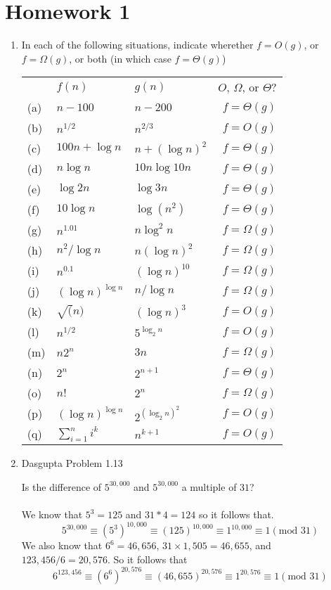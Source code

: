 \documentclass[a4paper,12pt]{article}
\begin{document}
\section*{Homework 1}

\begin{enumerate}
    \item In each of the following situations, indicate wherether $f = O(g)$, or $f = \Omega(g)$, or both (in which case $f = \Theta(g)$)

    \begin{tabular}{lll|r}
      ~ & $f(n)$ & $g(n)$ & $O$, $\Omega$, or $\Theta$?\\
      (a) & $n - 100$ & $n - 200$ & $f = \Theta(g)$ \\
      (b) & $n^{1/2}$ & $n^{2/3}$ & $f = O(g)$\\
      (c) & $100n + \log n$ & $n + (\log n)^2$& $f = \Theta(g)$ \\
      (d) & $n \log n $ & $10n \log 10n$ & $f = \Theta(g)$\\
      (e) & $\log 2n$ & $\log 3n$ & $f = \Theta(g)$ \\
      (f) & $10 \log n$ & $\log(n^2)$ & $f = \Theta(g)$ \\
      (g) & $n^{1.01}$ & $n \log^2 n$ & $f = \Omega(g)$\\
      (h) & $n^2 / \log n$ & $n(\log n)^2$ & $f = \Omega(g)$\\
      (i) & $n^{0.1}$ & $(\log n)^{10}$ & $f = \Omega(g)$\\
      (j) & $(\log n)^{\log n}$ & $n / \log n$ & $f = \Omega(g)$\\
      (k) & $\sqrt(n)$ & $(\log n)^3$ & $f = O(g)$\\
      (l) & $n^{1/2}$ & $5^{\log_2 n}$ & $f = O(g)$\\
      (m) & $n2^n$ & $3n$ & $f = \Omega(g)$\\
      (n) & $2^n$ & $2^{n+1}$ & $f = \Theta(g)$ \\
      (o) & $n!$ & $2^n$ & $f = \Omega(g)$ \\
      (p) & $(\log n)^{\log n}$ & $2^{(\log_2 n)^2}$ & $f = O(g)$ \\
      (q) & $\sum_{i = 1}^n i^k$ & $n^{k+1}$ & $f = O(g)$\\
    \end{tabular}
    \item Dasgupta Problem 1.13

    Is the difference of $5^{30,000}$ and $5^{30,000}$ a multiple of $31$?
    \\\\
    We know that $5^3 = 125$ and $31*4 = 124$ so it follows that.
    $$5^{30,000} \equiv (5^3)^{10,000} \equiv (125)^{10,000} \equiv 1^{10,000} \equiv 1 (\text{mod } 31)$$
    We also know that $6^6 = 46,656$, $31\times 1,505 = 46,655$, and $123,456/6=20,576$. So it follows that
    $$6^{123,456} \equiv (6^6)^{20,576} \equiv (46,655)^{20,576} \equiv 1^{20,576} \equiv 1 (\text{mod } 31)$$


\end{enumerate}
\end{document}
